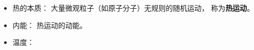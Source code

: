 
\begin{issues}
\issueDraft
\end{issues}

\begin{itemize}
\item 热的本质： 大量微观粒子（如原子分子）无规则的随机运动， 称为\textbf{热运动}。
\item 内能： 热运动的动能。
\item 温度： 
\end{itemize}
